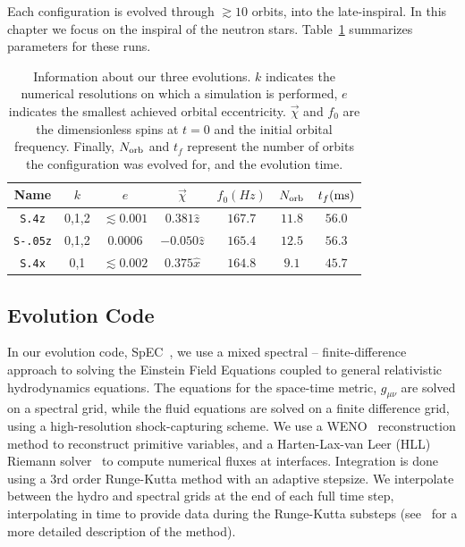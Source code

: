 Each configuration is evolved through $\gtrsim 10$ orbits, into the
late-inspiral. In this chapter we focus on the inspiral of the neutron
stars. Table~\ref{tab:RunInfo} summarizes parameters for these runs.
\begin{table}
\centering
\begin{tabular} {c | c | c | c | c | c | c}
Name & $k$ & $e$ & $\vec{\chi}$ & $f_{0}(Hz)$ & $N_{\rm orb}$ & $t_{f}({\rm ms})$ \\ \hline
{\tt S.4z} & 0,1,2 & $\lesssim 0.001$ & $0.381\hat{z}$ & $167.7$ & $11.8$ & $56.0$ \\ \hline
{\tt S-.05z} & 0,1,2 & $0.0006$ & $-0.050\hat{z}$ & $165.4$ & $12.5$ & $56.3$ \\ \hline
{\tt S.4x} & 0,1 & $\lesssim 0.002$ & $0.375\hat{x}$ & $164.8$ & $9.1$ & $45.7$ \\ \hline
\end{tabular}
\caption[Detailed information about our three evolutions.]{ {\label{tab:RunInfo}} Information about our three evolutions. $k$ indicates the numerical resolutions on which a simulation is performed, $e$ indicates the smallest achieved orbital eccentricity. $\vec\chi$ and $f_0$ are the dimensionless spins at $t=0$ and the initial orbital frequency. Finally, $N_{\rm orb}$ and $t_f$ represent the number of orbits the configuration was evolved for, and the evolution time.}
\end{table}



\subsection{Evolution Code}
\label{sec:EvolutionCode}

In our evolution code, SpEC~\citep{Buchman:2012dw,Lovelace:2011nu,
  Scheel2009,Kidder2000a,Lindblom2006,Scheel2006,Szilagyi:2009qz,Lovelace:2010ne,
  Hemberger:2012jz,Ossokine:2013zga}, we use a mixed spectral --
finite-difference approach to solving the Einstein Field Equations
coupled to general relativistic hydrodynamics equations. The
equations for the space-time metric, $g_{\mu\nu}$ are solved on a
spectral grid, while the fluid equations are solved on a finite
difference grid, using a high-resolution shock-capturing scheme. We
use a WENO~\citep{Jiang1996202,Liu1994200} reconstruction method to
reconstruct primitive variables, and a Harten-Lax-van Leer (HLL) Riemann solver~\cite{HLL}
to compute numerical fluxes at interfaces. Integration is done using a
3rd order Runge-Kutta method with an adaptive stepsize. We interpolate
between the hydro and spectral grids at the end of each full time
step, interpolating in time to provide data during the Runge-Kutta
substeps
(see~\cite{Duez:2008rb,FoucartEtAl:2011,Foucart:2013a,Muhlberger2014}
for a more detailed description of the method). 

